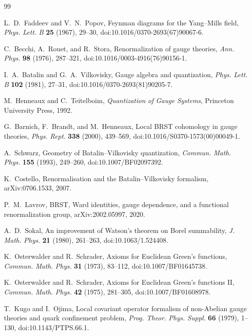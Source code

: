 \documentclass[11pt]{article}
\begin{document}
\begin{thebibliography}{99}

L.~D.~Faddeev and V.~N.~Popov,
Feynman diagrams for the Yang--Mills field,
\emph{Phys. Lett. B} \textbf{25} (1967), 29--30,
doi:10.1016/0370-2693(67)90067-6.

C.~Becchi, A.~Rouet, and R.~Stora,
Renormalization of gauge theories,
\emph{Ann. Phys.} \textbf{98} (1976), 287--321,
doi:10.1016/0003-4916(76)90156-1.

I.~A.~Batalin and G.~A.~Vilkovisky,
Gauge algebra and quantization,
\emph{Phys. Lett. B} \textbf{102} (1981), 27--31,
doi:10.1016/0370-2693(81)90205-7.

M.~Henneaux and C.~Teitelboim,
\emph{Quantization of Gauge Systems},
Princeton University Press, 1992.

G.~Barnich, F.~Brandt, and M.~Henneaux,
Local BRST cohomology in gauge theories,
\emph{Phys. Rept.} \textbf{338} (2000), 439--569,
doi:10.1016/S0370-1573(00)00049-1.

A.~Schwarz,
Geometry of Batalin--Vilkovisky quantization,
\emph{Commun. Math. Phys.} \textbf{155} (1993), 249--260,
doi:10.1007/BF02097392.

K.~Costello,
Renormalisation and the Batalin--Vilkovisky formalism,
arXiv:0706.1533, 2007.

P.~M.~Lavrov,
BRST, Ward identities, gauge dependence, and a functional renormalization group,
arXiv:2002.05997, 2020.

A.~D.~Sokal,
An improvement of Watson's theorem on Borel summability,
\emph{J. Math. Phys.} \textbf{21} (1980), 261--263,
doi:10.1063/1.524408.

K.~Osterwalder and R.~Schrader,
Axioms for Euclidean Green's functions,
\emph{Commun. Math. Phys.} \textbf{31} (1973), 83--112,
doi:10.1007/BF01645738.

K.~Osterwalder and R.~Schrader,
Axioms for Euclidean Green's functions II,
\emph{Commun. Math. Phys.} \textbf{42} (1975), 281--305,
doi:10.1007/BF01608978.

T.~Kugo and I.~Ojima,
Local covariant operator formalism of non-Abelian gauge theories and quark confinement problem,
\emph{Prog. Theor. Phys. Suppl.} \textbf{66} (1979), 1--130,
doi:10.1143/PTPS.66.1.


\end{thebibliography}
\end{document}
